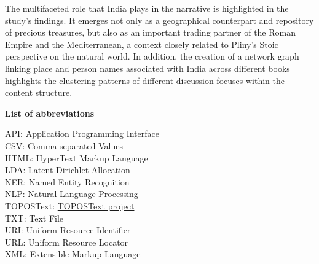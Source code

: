 The multifaceted role that India plays in the narrative is highlighted in the study’s findings. It emerges not only as a geographical counterpart and repository of precious treasures, but also as an important trading partner of the Roman Empire and the Mediterranean, a context closely related to Pliny’s Stoic perspective on the natural world. In addition, the creation of a network graph linking place and person names associated with India across different books highlights the clustering patterns of different discussion focuses within the content structure.

\newpage


\raggedright

\Large\textbf{List of abbreviations}   

\vspace*{\baselineskip}
\normalsize
API: Application Programming Interface\\
\medskip
CSV: Comma-separated Values\\
\medskip
HTML: HyperText Markup Language\\
\medskip
LDA: Latent Dirichlet Allocation\\
\medskip
NER: Named Entity Recognition\\
\medskip
NLP: Natural Language Processing \\
\medskip
TOPOSText: \href{https://topostext.org/}{TOPOSText project} \\
\medskip
TXT: Text File\\
\medskip
URI: Uniform Resource Identifier\\
\medskip
URL: Uniform Resource Locator\\
\medskip
XML: Extensible Markup Language\\


\newpage

\normalsize
\justifying